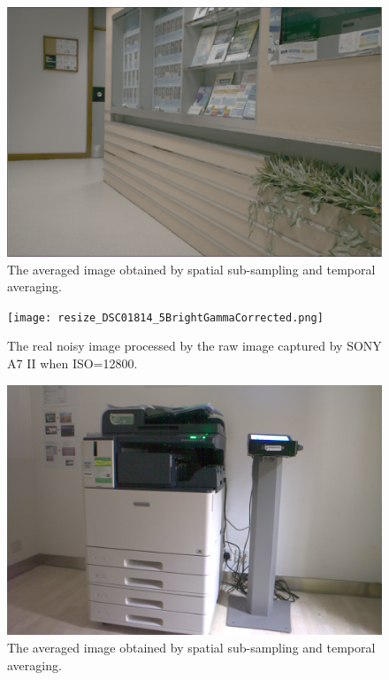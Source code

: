 \documentclass[10pt,twocolumn,letterpaper]{article}
\begin{document}
\begin{figure}
\centering
\includegraphics[width=0.8\linewidth]{STA.png}
\vspace{-4mm}
\caption{The averaged image obtained by spatial sub-sampling and temporal averaging.
}
\label{f3}
\end{figure}


\begin{figure}
\centering
\texttt{[image: resize\_DSC01814\_5BrightGammaCorrected.png]}
\vspace{-4mm}
\caption{The real noisy image processed by the raw image captured by SONY A7 II when ISO=12800.
}
\label{f4}
\end{figure}


\begin{figure}
\centering
\includegraphics[width=0.8\linewidth]{SONY_A7II_ISO12800_A_5BrightGammaCorrected.png}
\vspace{-4mm}
\caption{The averaged image obtained by spatial sub-sampling and temporal averaging.
}
\label{f5}
\end{figure}


{
\small


}
\end{document}
